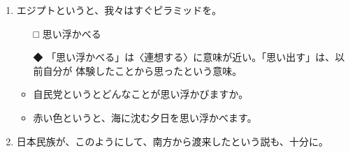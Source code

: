 \documentclass[
uplatex,
b5paper,
10pt,
dvipdfmx
]{jsbook}
\begin{document}
\begin{enumerate}
\begin{itemize}
\item[□] さわる、くわない、いらない、なる
\item[◆] 「気」に関係のある慣用表現は多い。
\end{itemize}
\begin{itemize}
\item 「気に障（さわ）る」は〈気分を害する〉の意 
\item 「気に食（くわ）ない」は〈気に入らなくて不愉快だ〉の意味
\item 「気に入（い）らない」は〈私の好みではない〉
\end{itemize}

\begin{itemize}
\item 「どうして、怒っているんですか。何か気に障ることを、私が言ったんだっ
      たら、謝ります。」
\item あいつは気に食わないやつだ。（＝私はあの人が嫌いだ）
\item このネックレスはとても気に入っているのよ。
\item 父はちょ{}っとでも気に入らないことがあると、すぐ不機嫌になる。
\end{itemize}
  
\item エジプトというと、我々はすぐピラミッドを\underline{\hspace{3zw}}。
\begin{itemize}
\item[□] 思い浮かべる
\item[◆] 「思い浮かべる」は〈連想する〉に意味が近い。「思い出す」は、以
	  前自分が 体験したことから思ったという意味。
\end{itemize}
\begin{itemize}
\item 自民党というとどんなことが思い浮かびますか。
\item 赤い色というと、海に沈む夕日を思い浮かべます。
\end{itemize}

\item 日本民族が、このようにして、南方から渡来したという説も、十分に\underline{\hspace{3zw}}。


\end{enumerate}
\end{document}

